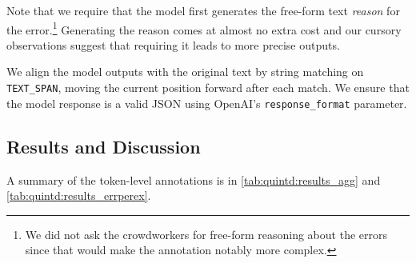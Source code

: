 Note that we require that the model first generates the free-form text \textit{reason} for the error.\footnote{We did not ask the crowdworkers for free-form reasoning about the errors since that would make the annotation notably more complex.} Generating the reason comes at almost no extra cost and our cursory observations suggest that requiring it leads to more precise outputs.

We align the model outputs with the original text by string matching on \texttt{TEXT\_SPAN}, moving the current position forward after each match. We ensure that the model response is a valid JSON using OpenAI's \texttt{response\_format} parameter.






\subsection{Results and Discussion}
\label{sec:quintd:discussion}

A summary of the token-level annotations is in \autoref{tab:quintd:results_agg} and \ref{tab:quintd:results_errperex}.


